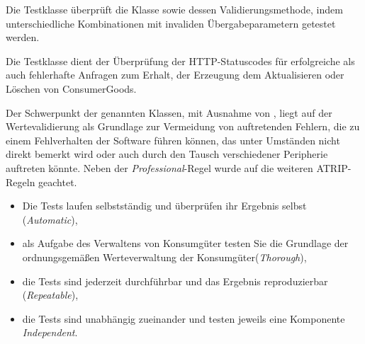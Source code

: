 Die Testklasse \href{}{\code{}} überprüft die Klasse \href{}{\code{}} sowie dessen Validierungsmethode, indem unterschiedliche Kombinationen mit invaliden Übergabeparametern getestet werden.

Die Testklasse \href{}{\code{}} dient der Überprüfung der \href{}{\code{}}\ac{HTTP}-Statuscodes für erfolgreiche als auch fehlerhafte Anfragen zum Erhalt, der Erzeugung dem Aktualisieren oder Löschen von ConsumerGoods.

Der Schwerpunkt der genannten Klassen, mit Ausnahme von \href{}{\code{}}, liegt auf der Wertevalidierung als Grundlage zur Vermeidung von auftretenden Fehlern, die zu einem Fehlverhalten der Software führen können, das unter Umständen nicht direkt bemerkt wird oder auch durch den Tausch verschiedener Peripherie auftreten könnte.
Neben der \textit{Professional}-Regel wurde auf die weiteren ATRIP-Regeln geachtet.
\begin{itemize}
    \item Die Tests laufen selbstständig und überprüfen ihr Ergebnis selbst (\textit{Automatic}),
    \item als Aufgabe des Verwaltens von Konsumgüter testen Sie die Grundlage der ordnungsgemäßen Werteverwaltung der Konsumgüter(\textit{Thorough}),
    \item die Tests sind jederzeit durchführbar und das Ergebnis reproduzierbar (\textit{Repeatable}),
    \item die Tests sind unabhängig zueinander und testen jeweils eine Komponente \textit{Independent}.
\end{itemize}

